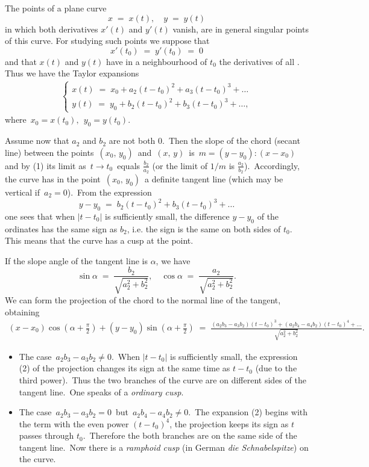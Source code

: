 \documentclass[12pt]{article}
\theoremstyle{definition}
\begin{document}
 

The points of a plane curve
 $$x \;=\; x(t), \quad y \;=\; y(t)$$
in which both derivatives $x'(t)$ and $y'(t)$ vanish, are in general singular points of this curve.  For studying such points we suppose that
 $$x'(t_0) \;=\; y'(t_0) \;=\; 0$$ 
and that $x(t)$ and $y(t)$ have in a neighbourhood of $t_0$ the derivatives of all .\, Thus we have the Taylor expansions
\begin{align}
\begin{cases}
x(t) \;=\; x_0+a_2(t\!-\!t_0)^2+a_3(t\!-\!t_0)^3+\ldots\\
y(t) \;=\; y_0+b_2(t\!-\!t_0)^2+b_3(t\!-\!t_0)^3+\ldots,
\end{cases}
\end{align}
where\, $x_0 = x(t_0),\;\, y_0 = y(t_0)$.

Assume now that $a_2$ and $b_2$ are not both 0.\, Then the slope of the chord (secant line) between the points \,$(x_0,\,y_0)$\, and\, $(x,\,y)$\, is\, $m = (y-y_0)\!:\!(x-x_0)$\, and by (1) its limit as\, $t \to t_0$\, equals $\frac{b_2}{a_2}$ (or the limit of $1/m$ is $\frac{a_2}{b_2}$).\, Accordingly, the curve has in the point \,$(x_0,\,y_0)$\, a definite tangent line (which may be vertical if\, $a_2 = 0$).\, From the expression
 $$y\!-\!y_0 \;=\; b_2(t\!-\!t_0)^2+b_3(t\!-\!t_0)^3+\ldots$$
one sees that when $|t\!-\!t_0|$ is sufficiently small, the difference $y\!-\!y_0$ of the ordinates has the same sign as $b_2$, i.e. the sign is the same on both sides of $t_0$.\, This means that the curve has a cusp at the point.

If the slope angle of the tangent line is $\alpha$, we have
 $$\sin\alpha \;=\; \frac{b_2}{\sqrt{a_2^2\!+\!b_2^2}}, \quad \cos\alpha \;=\; \frac{a_2}{\sqrt{a_2^2\!+\!b_2^2}}.$$
We can form the projection of the chord to the normal line of the tangent, obtaining
\begin{align}
(x\!-\!x_0)\cos(\alpha\!+\!\frac{\pi}{2})+(y\!-\!y_0)\sin(\alpha\!+\!\frac{\pi}{2}) 
\;=\; \frac{(a_2b_3\!-\!a_3b_2)(t\!-\!t_0)^3\!+\!(a_2b_4\!-\!a_4b_2)(t\!-\!t_0)^4\!+\ldots}{\sqrt{a_2^2\!+\!b_2^2}}.
\end{align}

\begin{itemize} 
\item The case\, $a_2b_3\!-\!a_3b_2 \neq 0$.\, When $|t\!-\!t_0|$ is sufficiently small, the expression (2) of the projection changes its sign at the same time as $t\!-\!t_0$ (due to the third power).\, Thus the two branches of the curve are on different sides of the tangent line.\, One speaks of a {\em ordinary cusp}.
\item The case\, $a_2b_3\!-\!a_3b_2 = 0$\, but\, $a_2b_4\!-\!a_4b_2 \neq 0$.\, The expansion (2) begins with the term with the even power $(t\!-\!t_0)^4$, the projection keeps its sign as $t$ passes through $t_0$.\, Therefore the both branches are on the same side of the tangent line.\, Now there is a {\em ramphoid cusp} (in German {\em die Schnabelspitze}) on the curve.\\
\end{itemize}
\end{document}
